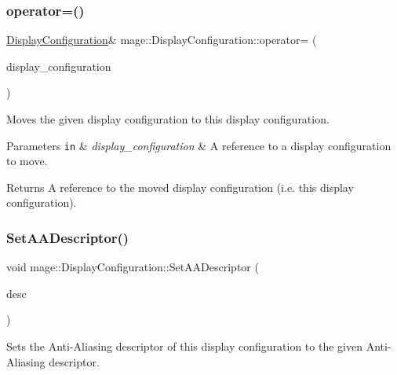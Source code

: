 \subsubsection{\texorpdfstring{operator=()}{operator=()}\hspace{0.1cm}{\footnotesize\ttfamily [2/2]}}
{\footnotesize\ttfamily \hyperlink{structmage_1_1_display_configuration}{Display\+Configuration}\& mage\+::\+Display\+Configuration\+::operator= (\begin{DoxyParamCaption}\item[{\hyperlink{structmage_1_1_display_configuration}{Display\+Configuration} \&\&}]{display\+\_\+configuration }\end{DoxyParamCaption})\hspace{0.3cm}{\ttfamily [default]}}

Moves the given display configuration to this display configuration.


\begin{DoxyParams}[1]{Parameters}
\mbox{\tt in}  & {\em display\+\_\+configuration} & A reference to a display configuration to move. \\
\hline
\end{DoxyParams}
\begin{DoxyReturn}{Returns}
A reference to the moved display configuration (i.\+e. this display configuration). 
\end{DoxyReturn}
\hypertarget{structmage_1_1_display_configuration_a2fec79b21c772a3d73e44cca7d8bd9d7}{}\label{structmage_1_1_display_configuration_a2fec79b21c772a3d73e44cca7d8bd9d7} 
\subsubsection{\texorpdfstring{Set\+A\+A\+Descriptor()}{SetAADescriptor()}}
{\footnotesize\ttfamily void mage\+::\+Display\+Configuration\+::\+Set\+A\+A\+Descriptor (\begin{DoxyParamCaption}\item[{\hyperlink{namespacemage_a86cd40b8f2f42ca4d616cc6ec665a7f2}{A\+A\+Descriptor}}]{desc }\end{DoxyParamCaption})\hspace{0.3cm}{\ttfamily [noexcept]}}

Sets the Anti-\/\+Aliasing descriptor of this display configuration to the given Anti-\/\+Aliasing descriptor.


